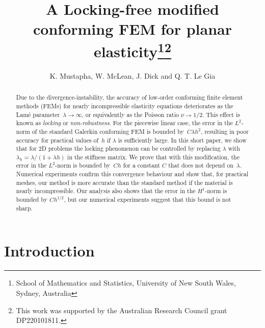 \documentclass[11pt]{article}
\title{A Locking-free modified conforming FEM for planar elasticity\thanks{School of Mathematics and Statistics, University of New South Wales, Sydney, Australia}\thanks{This work was supported by the Australian Research Council
grant DP220101811.}}
\author{K. Mustapha, W. McLean, J. Dick and  Q. T. Le Gia}
\numberwithin{equation}{section}
\begin{document}
\maketitle
\begin{abstract}
Due to the divergence-instability, the accuracy of low-order
conforming finite element methods (FEMs) for nearly incompressible elasticity
equations deteriorates as the Lam\'e parameter~$\lambda\to\infty$, or
equivalently as the Poisson ratio $\nu\to1/2$.  This effect is known
as \emph{locking} or \emph{non-robustness}. For the piecewise linear case, the
error in the $L^2$-norm of the standard Galerkin conforming FEM is bounded
by~$C\lambda h^2$, resulting in poor accuracy for practical values of~$h$ if
$\lambda$ is sufficiently large. In this short paper, we show that for 2D
problems the locking phenomenon can be controlled by replacing
$\lambda$ with~$\lambda_h=\lambda/(1+\lambda h)$ in the stiffness matrix. We
prove that with this modification, the error in the $L^2$-norm is bounded
by~$Ch$ for a constant $C$ that does not depend on~$\lambda$.  Numerical
experiments confirm this convergence behaviour and show that, for
practical meshes, our  method is more accurate than the standard method if the
material is nearly incompressible.  Our analysis also shows that the error in
the $H^1$-norm is bounded by $Ch^{1/2}$, but our numerical experiments suggest
that this bound is not sharp.
\end{abstract}
\section{Introduction}
\end{document}
